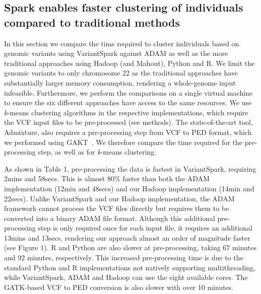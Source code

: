 \documentclass{bmcart}
\newcommand{\variantSpark}{{\sc VariantSpark}}
\newcommand{\kMeans}{\textit{k}-means}
\begin{document}
\subsection*{{\sc Spark} enables faster clustering of individuals compared to traditional methods}

In this section we compare the time required to cluster individuals based on genomic variants using \variantSpark{} against {\sc ADAM} as well as the more traditional approaches using Hadoop (and Mahout), Python and R. 
We limit the genomic variants to only chromosome 22 as the traditional approaches have substantially larger memory consumption, rendering a whole-genome input infeasible.  
Furthermore, we perform the comparisons on a single virtual machine to ensure the six different approaches have access to the same resources.
We use \kMeans{} clustering algorithms in the respective implementations, which require the VCF input files to be pre-processed (see methods). 
The state-of-the-art tool, {\sc Admixture}, also requires a pre-processing step from VCF to PED format, which we performed using GAKT~\cite{McKenna2010}.
We therefore compare the time required for the pre-processing step, as well as for \kMeans{} clustering.

As shown in Table 1, pre-processing the data is fastest in \variantSpark{}, requiring 2mins and 58secs. %
This is almost 80\% faster than both the {\sc ADAM} implementation (12min and 48secs) %
and our Hadoop implementation (14min and 22secs). %
Unlike \variantSpark{} and our Hadoop implementation, the {\sc ADAM} framework cannot process the VCF files directly but requires them to be converted into a binary {\sc ADAM} file format. 
Although this additional pre-processing step is only required once for each input file, it requires an additional 13mins and 13secs, %
rendering our approach almost an order of magnitude faster (see Figure 1).
R and Python are also slower at pre-processing, taking 67 minutes and 92 minutes, respectively. 
This increased pre-processing time is due to the standard Python and R implementations not natively supporting multithreading, while \variantSpark{}, {\sc ADAM} and Hadoop can use the eight available cores.
The GATK-based VCF to PED conversion is also slower with over 10 minutes. 
\end{document}
